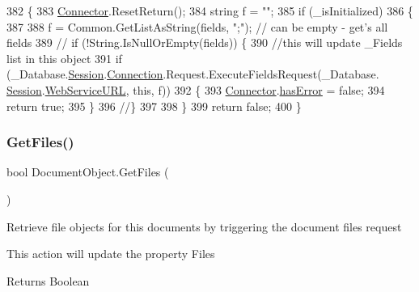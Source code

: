 \begin{DoxyCode}
382     \{
383         \mbox{\hyperlink{class_connector}{Connector}}.ResetReturn();
384         \textcolor{keywordtype}{string} f = \textcolor{stringliteral}{""};
385         \textcolor{keywordflow}{if} (\_isInitialized)
386         \{
387 
388             f = Common.GetListAsString(fields, \textcolor{stringliteral}{";"}); \textcolor{comment}{// can be empty - get's all fields}
389             \textcolor{comment}{// if (!String.IsNullOrEmpty(fields)) \{}
390             \textcolor{comment}{//this will update \_Fields list in this object}
391             \textcolor{keywordflow}{if} (\_Database.\mbox{\hyperlink{class_database_object_aa8484162b7d2a7c4c9426bca13c64c07}{Session}}.\mbox{\hyperlink{class_session_object_a014bdbf705a753540e19bfb53030c55c}{Connection}}.Request.ExecuteFieldsRequest(\_Database.
      \mbox{\hyperlink{class_database_object_aa8484162b7d2a7c4c9426bca13c64c07}{Session}}.\mbox{\hyperlink{class_session_object_a697c071c812fbf7ad1166b896fb44c16}{WebServiceURL}}, \textcolor{keyword}{this}, f))
392             \{
393                 \mbox{\hyperlink{class_connector}{Connector}}.\mbox{\hyperlink{class_connector_a079bae21a5417efa53bfe8954c0f533f}{hasError}} = \textcolor{keyword}{false};
394                 \textcolor{keywordflow}{return} \textcolor{keyword}{true};
395             \}
396             \textcolor{comment}{//\}}
397 
398         \}
399         \textcolor{keywordflow}{return} \textcolor{keyword}{false};
400     \}
\end{DoxyCode}
\mbox{\label{class_document_object_a2c8aee9450e8fdd1e84e8ff26d0950a1}} 
\subsubsection{\texorpdfstring{Get\+Files()}{GetFiles()}}
{\footnotesize\ttfamily bool Document\+Object.\+Get\+Files (\begin{DoxyParamCaption}{ }\end{DoxyParamCaption})}



Retrieve file objects for this documents by triggering the document files request 

This action will update the property \textquotesingle{}Files\textquotesingle{}

\begin{DoxyReturn}{Returns}
Boolean
\end{DoxyReturn}


